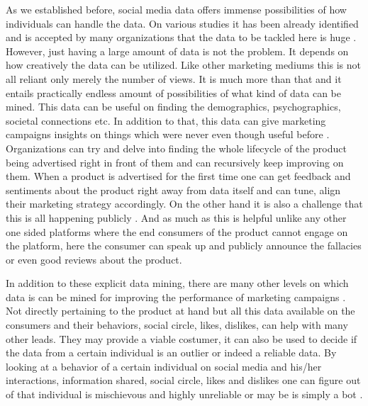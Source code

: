 \documentclass[sigconf]{acmart}
\begin{document}
As we established before, social media data offers immense possibilities of how individuals can handle the data. On various studies it has been already identified and is accepted by many organizations that the data to be tackled here is huge \cite{roberta}. However, just having a large amount of data is not the problem. It depends on how creatively the data can be utilized. Like other marketing mediums this is not all reliant only merely the number of views. It is much more than that and it entails practically endless amount of possibilities of what kind of data can be mined. This data can be useful on finding the demographics, psychographics, societal connections etc. In addition to that, this data can give marketing campaigns insights on things which were never even though useful before \cite{alexendras}. Organizations can try and delve into finding the whole lifecycle of the product being advertised right in front of them and can recursively keep improving on them. When a product is advertised for the first time one can get feedback and sentiments about the product right away from data itself and can tune, align their marketing strategy accordingly. On the other hand it is also a challenge that this is all happening publicly \cite{Horn2015}. And as much as this is helpful unlike any other one sided platforms where the end consumers of the product cannot engage on the platform, here the consumer can speak up and publicly announce the fallacies or even good reviews about the product.

In addition to these explicit data mining, there are many other levels on which data is can be mined for improving the performance of marketing campaigns \cite{michelen} \cite{mylynnfelt}. Not directly pertaining to the product at hand but all this data available on the consumers and their behaviors, social circle, likes, dislikes, can help with many other leads. They may provide a viable costumer, it can also be used to decide if the data from a certain individual is an outlier or indeed a reliable data. By looking at a behavior of a certain individual on social media and his/her interactions, information shared, social circle, likes and dislikes one can figure out of that individual is mischievous and highly unreliable or may be is simply a bot \cite{Ferrara}.
\end{document}
